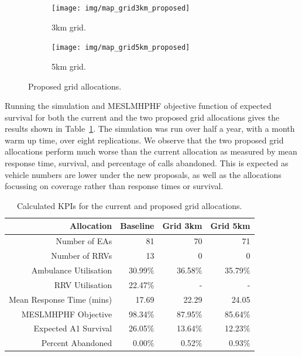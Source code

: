 \documentclass[numbers,webpdf,imaman]{ima-authoring-template}%
\begin{document}
\begin{figure}
\begin{center}
\begin{subfigure}{0.37\textwidth}
\texttt{[image: img/map\_grid3km\_proposed]}
\caption{3km grid.}
\end{subfigure}
\hspace{8mm}
\begin{subfigure}{0.37\textwidth}
\texttt{[image: img/map\_grid5km\_proposed]}
\caption{5km grid.}
\end{subfigure}
\caption{Proposed grid allocations.}
\label{fig:grid_allocations}
\end{center}
\end{figure}

Running the simulation and MESLMHPHF objective function of expected survival for
both the current and the two proposed grid allocations gives the results shown
in Table~\ref{tbl:current_grid_results}. The simulation was run over half a
year, with a month warm up time, over eight replications. We observe that the
two proposed grid allocations perform much worse than the current allocation as
measured by mean response time, survival, and percentage of calls abandoned.
This is expected as vehicle numbers are lower under the new proposals, as well
as the allocations focussing on coverage rather than response times or survival.

\begin{table}
\begin{tabular}{rrrr}
\toprule
Allocation & Baseline & Grid 3km & Grid 5km \\
\midrule
Number of EAs & 81 & 70 & 71 \\
Number of RRVs & 13 & 0 & 0 \\
Ambulance Utilisation & 30.99\% & 36.58\% & 35.79\% \\
RRV Utilisation & 22.47\% & - & - \\
Mean Response Time (mins) & 17.69 & 22.29 & 24.05 \\
MESLMHPHF Objective & 98.34\% & 87.95\% & 85.64\% \\
Expected A1 Survival & 26.05\% & 13.64\% & 12.23\% \\
Percent Abandoned & 0.00\% & 0.52\% & 0.93\% \\
\bottomrule
\end{tabular}
\caption{Calculated KPIs for the current and proposed grid allocations.}
\label{tbl:current_grid_results}
\end{table}
\end{document}

